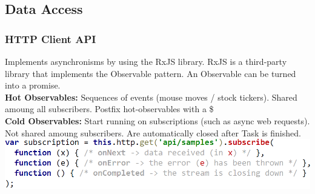 \subsection{Data Access}
\subsubsection{HTTP Client API}
Implements asynchronisms by using the RxJS library.
RxJS is a third-party library that implements the Observable pattern.
An Observable can be turned into a promise.\\
\textbf{Hot Observables:} Sequences of events (mouse moves / stock tickers).
Shared amoung all subscribers.
Postfix hot-observables with a \$\\
\textbf{Cold Observables:} Start running on subscriptions (such as async web requests).
Not shared amoung subscribers.
Are automatically closed after Task is finished.\\
\includegraphics[width=0.8\linewidth]{img/angular_observable.png}


